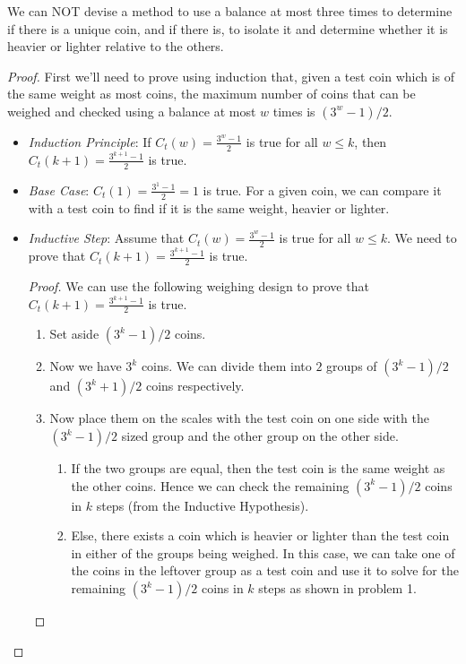 \documentclass[name=Mehul\ Arora, andrewid=mehul21066, course=CSE121, num=1]{homework}
\begin{document}
\begin{claim}
    We can NOT devise a method to use a balance at most three times to determine if there is a unique coin, and if there is, to isolate it and determine whether it is heavier or lighter relative to the others.
\end{claim}
\begin{proof}
    First we'll need to prove using induction that, given a test coin which is of the same weight as most coins, the maximum number of coins that can be weighed and checked using a balance at most $w$ times is $(3^{w}-1)/2$.
    \begin{itemize}[label=$\lozenge$, itemsep=2ex]
        \item \emph{Induction Principle}: If $C_{t}(w)=\frac{3^{w}-1}{2}$ is true for all $w\leq k$, then $C_{t}(k+1)=\frac{3^{k+1}-1}{2}$ is true.
        \item \emph{Base Case}: $C_{t}(1)=\frac{3^{1}-1}{2}=1$ is true. For a given coin, we can compare it with a test coin to find if it is the same weight, heavier or lighter.
        \item \emph{Inductive Step}: Assume that $C_{t}(w)=\frac{3^{w}-1}{2}$ is true for all $w\leq k$. We need to prove that $C_{t}(k+1)=\frac{3^{k+1}-1}{2}$ is true.
        \begin{proof}
            We can use the following weighing design to prove that $C_{t}(k+1)=\frac{3^{k+1}-1}{2}$ is true.
            \begin{enumerate}
                \item Set aside $(3^{k}-1)/2$ coins.
                \item Now we have $3^{k}$ coins. We can divide them into $2$ groups of $(3^{k}-1)/2$ and $(3^{k}+1)/2$ coins respectively.
                \item Now place them on the scales with the test coin on one side with the $(3^{k}-1)/2$ sized group and the other group on the other side.
                \begin{enumerate}
                    \item If the two groups are equal, then the test coin is the same weight as the other coins. Hence we can check the remaining $(3^{k}-1)/2$ coins in $k$ steps (from the Inductive Hypothesis).
                    \item Else, there exists a coin which is heavier or lighter than the test coin in either of the groups being weighed. In this case, we can take one of the coins in the leftover group as a test coin and use it to solve for the remaining $(3^k-1)/2$ coins in $k$ steps as shown in problem 1.

\end{enumerate}
\end{enumerate}
\end{proof}
\end{itemize}
\end{proof}
\end{document}
